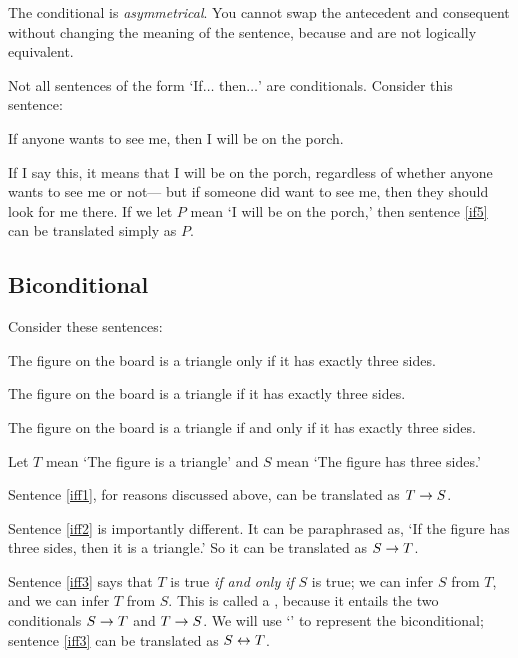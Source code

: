 The conditional is \emph{asymmetrical}. You cannot swap the antecedent and consequent without changing the meaning of the sentence, because \eif{} and \eif{} are not logically equivalent.


Not all sentences of the form `If$\ldots$ then$\ldots$' are conditionals. Consider this sentence:

\begin{earg}
\item[\ex{if5}] If anyone wants to see me, then I will be on the porch.
\end{earg}

If I say this, it means that I will be on the porch, regardless of whether anyone wants to see me or not--- but if someone did want to see me, then they should look for me there. If we let $P$ mean `I will be on the porch,' then sentence \ref{if5} can be translated simply as $P$.


\subsection{Biconditional}
Consider these sentences:
\begin{earg}
\item[\ex{iff1}] The figure on the board is a triangle only if it has exactly three sides.
\item[\ex{iff2}] The figure on the board is a triangle if it has exactly three sides.
\item[\ex{iff3}] The figure on the board is a triangle if and only if it has exactly three sides.
\end{earg}

Let $T$ mean `The figure is a triangle' and $S$ mean `The figure has three sides.'

Sentence \ref{iff1}, for reasons discussed above, can be translated as $T\rightarrow S$.

Sentence \ref{iff2} is importantly different. It can be paraphrased as, `If the figure has three sides, then it is a triangle.' So it can be translated as $S\rightarrow T$.

Sentence \ref{iff3} says that $T$ is true \emph{if and only if} $S$ is true; we can infer $S$ from $T$, and we can infer $T$ from $S$. This is called a , because it entails the two conditionals $S\rightarrow T$ and $T \rightarrow S$. We will use `\eiff' to represent the biconditional; sentence \ref{iff3} can be translated as $S \leftrightarrow T$.

